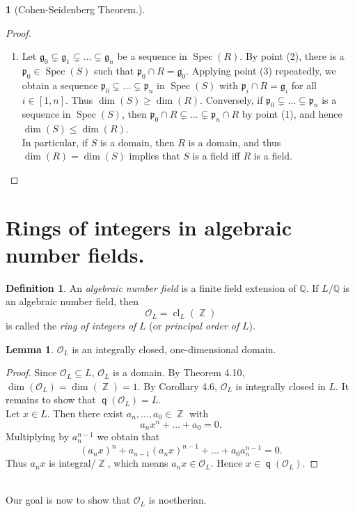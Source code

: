 \documentclass[12pt,a4paper]{report}
\theoremstyle{definition}
\newtheorem{lemma}[theorem]{Lemma}
\newtheorem{defn}[theorem]{Definition}
\theoremstyle{num.custom-title}
\newtheorem{teo_custom-title}[theorem]{} %
\DeclareMathOperator{\Z}{\mathbb{Z}}
\DeclareMathOperator{\sse}{\subseteq}
\DeclareMathOperator{\cl}{cl}
\DeclareMathOperator{\Spec}{Spec}
\DeclareMathOperator{\q}{\mathsf{q}}
\newcommand{\Q}{\mathbb{Q}}
\newcommand{\g}{\mathfrak{g}}
\newcommand{\p}{\mathfrak{p}}
\renewcommand{\O}{\mathcal{O}}
\begin{document}
\begin{teo_custom-title}[Cohen-Seidenberg Theorem.]
\begin{proof}
\begin{enumerate}
If $S$ is a field, then $R^\times = S^\times \cap R = S^\circ \cap R = R^\circ$, and hence $R$ is a field.
\item Let $\g_0 \subsetneq \g_1 \subsetneq \ldots \subsetneq \g_n$ be a sequence in $\Spec(R)$. By point (2), there is a $\p_0 \in \Spec(S)$ such that $\p_0 \cap R = \g_0$. Applying point (3) repeatedly, we obtain a sequence $\p_0 \subsetneq \ldots \subsetneq \p_n$ in $\Spec(S)$ with $\p_i \cap R = \g_i$ for all $i \in [1,n]$. Thus $\dim(S) \geq \dim(R)$. Conversely, if $\p_0 \subsetneq \ldots \subsetneq \p_n$ is a sequence in $\Spec(S)$, then $\p_0 \cap R \subsetneq \ldots \subsetneq \p_n \cap R$ by point (1), and hence $\dim(S) \leq \dim(R)$.\\
In particular, if $S$ is a domain, then $R$ is a domain, and thus $\dim(R)=\dim(S)$ implies that $S$ is a field iff $R$ is a field.
\end{enumerate}
\end{proof}
\end{teo_custom-title}


\section{Rings of integers in algebraic number fields.}

\begin{defn}
An \emph{algebraic number field} is a finite field extension of $\Q$. If $L/\Q$ is an algebraic number field, then
\[
\O_L = \cl_L(\Z)
\]
is called the \emph{ring of integers of} $L$ (or \emph{principal order of} $L$).
\end{defn}

\begin{lemma}
$\O_L$ is an integrally closed, one-dimensional domain.
\begin{proof}
Since $\O_L \sse L$, $\O_L$ is a domain. By Theorem 4.10, $\dim(\O_L)=\dim(\Z)=1$. By Corollary 4.6, $\O_L$ is integrally closed in $L$. It remains to show that $\q(\O_L)=L$. \\
Let $x \in L$. Then there exist $a_n,...,a_0 \in \Z$ with
\[
a_n x^n + \ldots + a_0 = 0.
\]
Multiplying by $a_n^{n-1}$ we obtain that
\[
(a_n x)^n + a_{n-1} (a_n x)^{n-1} + \ldots + a_0 a_n^{n-1} = 0.
\]
Thus $a_n x$ is integral$/\Z$, which means $a_n x \in \O_L$. Hence $x \in \q(\O_L)$.
\end{proof}
\end{lemma}
\ \\
Our goal is now to show that $\O_L$ is noetherian.\\
\end{document}
